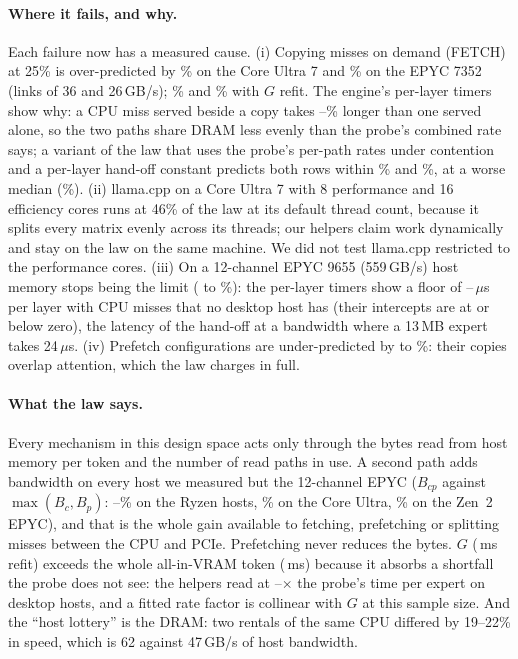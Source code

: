 \documentclass[10pt,twocolumn]{article}
\begin{document}
\paragraph{Where it fails, and why.} Each failure now has a measured cause. (i) Copying misses on demand (FETCH) at
25\% is over-predicted by \lohoFrozenFetchUltra\% on the Core Ultra 7 and \lohoFrozenFetchEpyc\% on the EPYC 7352 (links
of 36 and 26\,GB/s); \lohoMaxFetchUltra\% and \lohoMaxFetchEpyc\% with $G$ refit. The engine's per-layer timers show
why: a CPU miss served beside a copy takes \fetchBesideMin--\fetchBesideMax\% longer than one served alone, so the two
paths share DRAM less evenly than the probe's combined rate says; a variant of the law that uses the probe's
per-path rates under contention and a per-layer hand-off constant predicts both rows within \lohoAsymFetchUltra\% and
\lohoAsymFetchEpyc\%, at a worse median (\lohoAsymMed\%). (ii) llama.cpp on a Core Ultra 7 with 8 performance and 16 efficiency cores runs at 46\% of the
law at its default thread count, because it splits every matrix evenly across its threads; our helpers claim work
dynamically and stay on the law on the same machine. We did not test llama.cpp restricted to the performance cores.
(iii) On a 12-channel EPYC 9655 (559\,GB/s) host memory stops being the limit (\lohoMaxEpycMin{} to
\lohoMaxEpycMax\%): the per-layer timers show a floor of \epycFloorMin--\epycFloorMax\,$\mu$s per layer with CPU misses
that no desktop host has (their intercepts are at or below zero), the latency of the hand-off at a bandwidth where a
13\,MB expert takes 24\,$\mu$s. (iv) Prefetch configurations are under-predicted by \lohoMaxPfMin{} to
\lohoMaxPfMax\%: their copies overlap attention, which the law charges in full.

\paragraph{What the law says.} Every mechanism in this design space acts only through the bytes read from host memory
per token and the number of read paths in use. A second path adds bandwidth on every host we
measured but the 12-channel EPYC ($B_{cp}$ against $\max(B_c,B_p)$: \secondMin--\secondMax\% on the Ryzen hosts, \secondUltra\% on the
Core Ultra, \secondEpyc\% on the Zen~2 EPYC), and that is the whole gain available to fetching, prefetching or splitting
misses between the CPU and PCIe. Prefetching never reduces the bytes. $G$ (\lawGRefit\,ms refit) exceeds the whole
all-in-VRAM token (\vramMs\,ms) because it absorbs a shortfall the probe does not see: the helpers read at
\helperRateMin--\helperRateMax$\times$ the probe's time per expert on desktop hosts, and a fitted rate factor is
collinear with $G$ at this sample size. And the ``host lottery'' is the DRAM: two rentals of the same CPU differed by
19--22\% in speed, which is 62 against 47\,GB/s of host bandwidth.
\end{document}
